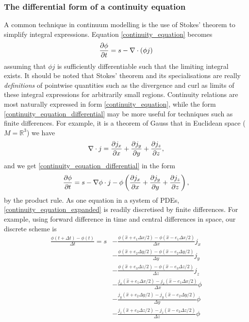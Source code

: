\subsubsection{The differential form of a continuity equation}
A common technique in continuum modelling is the use of Stokes' theorem to simplify integral expressions.
Equation \eqref{continuity_equation} becomes
\begin{equation}\label{continuity_equation_differential}
    \frac{\partial \phi}{\partial t} = s - \nabla\cdot (\phi j)
\end{equation}
assuming that $\phi j$ is sufficiently differentiable such that the limiting integral exists.
It should be noted that Stokes' theorem and its specialisations are really \textit{definitions} of pointwise quantities
such as the divergence and curl as limits of these integral expressions for arbitrarily small regions.
Continuity relations are most naturally expressed in form \eqref{continuity_equation}, while the form
\eqref{continuity_equation_differential} may be more useful for techniques such as finite differences.
For example, it is a theorem of Gauss that in Euclidean space ($M = \mathbb{R}^3$) we have
\begin{equation}\label{gauss_euclidean_divergence}
    \nabla \cdot j = \frac{\partial j_x}{\partial x} + \frac{\partial j_y}{\partial y} + \frac{\partial j_z}{\partial z},
\end{equation}
and we get \eqref{continuity_equation_differential} in the form
\begin{equation}\label{continuity_equation_expanded}
    \frac{\partial \phi}{\partial t} = s - \nabla \phi \cdot j - \phi\left(\frac{\partial j_x}{\partial x} + \frac{\partial j_y}{\partial y} + \frac{\partial j_z}{\partial z}\right),
\end{equation}
by the product rule.
As one equation in a system of PDEs, \eqref{continuity_equation_expanded} is readily discretised by finite differences. For example, using forward difference in time and
central differences in space, our discrete scheme is
\begin{equation}\label{continuity_equation_finite_differences}
\begin{split}
    \frac{\phi(t + \Delta t) - \phi(t)}{\Delta t} = s &-\frac{\phi(\hat{x} + e_1\Delta x/2) - \phi(\hat{x} - e_1\Delta x/2)}{\Delta x}j_x \\
                                                      &-\frac{\phi(\hat{x} + e_2\Delta y/2) - \phi(\hat{x} - e_2\Delta y/2)}{\Delta y}j_y \\
                                                      &-\frac{\phi(\hat{x} + e_3\Delta z/2) - \phi(\hat{x} - e_3\Delta z/2)}{\Delta z}j_z \\
                                                      &-\frac{j_x(\hat{x} + e_1\Delta x/2) - j_x(\hat{x} - e_1\Delta x/2)}{\Delta x}\phi \\
                                                      &-\frac{j_y(\hat{x} + e_2\Delta y/2) - j_y(\hat{x} - e_2\Delta y/2)}{\Delta y}\phi \\
                                                      &-\frac{j_z(\hat{x} + e_3\Delta z/2) - j_z(\hat{x} - e_3\Delta z/2)}{\Delta z}\phi
\end{split}
\end{equation}
